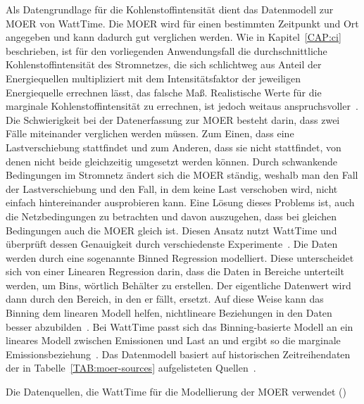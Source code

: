 Als Datengrundlage für die Kohlenstoffintensität dient das Datenmodell zur \ac{MOER} von WattTime.
Die \ac{MOER} wird für einen bestimmten Zeitpunkt und Ort angegeben und kann dadurch gut verglichen werden.
Wie in Kapitel~\ref{CAP:ci} beschrieben, ist für den vorliegenden Anwendungsfall die durchschnittliche Kohlenstoffintensität des Stromnetzes, die sich schlichtweg aus Anteil der Energiequellen multipliziert mit dem Intensitätsfaktor der jeweiligen Energiequelle errechnen lässt, das falsche Maß.
Realistische Werte für die marginale Kohlenstoffintensität zu errechnen, ist jedoch weitaus anspruchsvoller~\cite{WattTime.11212023}.
Die Schwierigkeit bei der Datenerfassung zur \ac{MOER} besteht darin, dass zwei Fälle miteinander verglichen werden müssen.
Zum Einen, dass eine Lastverschiebung stattfindet und zum Anderen, dass sie nicht stattfindet, von denen nicht beide gleichzeitig umgesetzt werden können.
Durch schwankende Bedingungen im Stromnetz ändert sich die \ac{MOER} ständig, weshalb man den Fall der Lastverschiebung und den Fall, in dem keine Last verschoben wird, nicht einfach hintereinander ausprobieren kann.
Eine Lösung dieses Problems ist, auch die Netzbedingungen zu betrachten und davon auszugehen, dass bei gleichen Bedingungen auch die \ac{MOER} gleich ist.
Diesen Ansatz nutzt WattTime und überprüft dessen Genauigkeit durch verschiedenste Experimente~\cite{WattTime.2022}.
Die Daten werden durch eine sogenannte Binned Regression modelliert.
Diese unterscheidet sich von einer Linearen Regression darin, dass die Daten in Bereiche unterteilt werden, um \glqq Bins\grqq{}, wörtlich Behälter zu erstellen.
Der eigentliche Datenwert wird dann durch den Bereich, in den er fällt, ersetzt.
Auf diese Weise kann das \glqq Binning\grqq{} dem linearen Modell helfen, nichtlineare Beziehungen in den Daten besser abzubilden~\cite{Muller.2017}.
Bei WattTime passt sich das Binning-basierte Modell an ein lineares Modell zwischen Emissionen und Last an und ergibt so die marginale Emissionsbeziehung~\cite{WattTime.2022}.
Das Datenmodell basiert auf historischen Zeitreihendaten der in Tabelle~\ref{TAB:moer-sources} aufgelisteten Quellen~\cite{WattTime.11212023}.
\begin{table}[t]
 \caption[Datenquellen MOER Modellierung]{Die Datenquellen, die WattTime für die Modellierung der MOER verwendet (\cite{WattTime.11212023})}
 \label{TAB:moer-sources}
 
\end{table}

